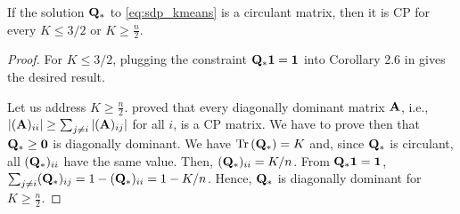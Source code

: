 \documentclass[twoside,11pt]{article}
\begin{document}

\begin{proposition}
	If the solution ${\mathbf{Q}}_*$ to \ref{eq:sdp_kmeans} is a circulant matrix, then it is CP for every $K \leq 3/2$ or $K \geq \tfrac{n}{2}$.
	\label{prop:circulantCP}%
\end{proposition}

\begin{proof}
	For $K \leq 3/2$, plugging the constraint ${\mathbf{Q}}_* {\mathbf{1}} = {\mathbf{1}}$ into Corollary 2.6 in \citep[][p.~7]{So2013} gives the desired result.
	
	Let us address $K \geq \tfrac{n}{2}$.
	\citet{Kaykobad1987} proved that every diagonally dominant matrix ${\mathbf{A}}$, i.e.,
	$|({\mathbf{A}})_{ii}| \geq \sum_{j \neq i} |({\mathbf{A}})_{ij}|$ for all $i$, is a CP matrix.
	We have to prove then that ${\mathbf{Q}}_* \geq {\mathbf{0}}$ is diagonally dominant.
	We have $\operatorname{Tr}\left({\mathbf{Q}}_*\right) = K$ and, since ${\mathbf{Q}}_*$ is circulant, all $({\mathbf{Q}}_*)_{ii}$ have the same value. Then, $({\mathbf{Q}}_*)_{ii} = K/n$.
	From ${\mathbf{Q}}_* {\mathbf{1}} = {\mathbf{1}}$,
	$\sum_{j \neq i} ({\mathbf{Q}}_*)_{ij} = 1 - ({\mathbf{Q}}_*)_{ii} = 1 - K/n$.
	Hence, ${\mathbf{Q}}_*$ is diagonally dominant for $K \geq \tfrac{n}{2}$.
\end{proof}
\end{document}
